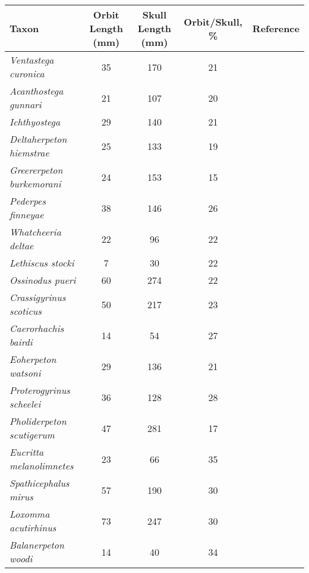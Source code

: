 \begin{tabular}{|l|c|c|c|c|}
\hline
\textbf{Taxon}&\textbf{Orbit Length (mm)}&\textbf{Skull Length (mm)}&\textbf{Orbit/Skull, \%}&\textbf{Reference}\\\hline
\textit{Ventastega curonica}&35&170&21&\citet{Ahlb08a}\\\hline
\textit{Acanthostega gunnari}&21&107&20&\citet{Clac02b,Porr15a}\\\hline
\textit{Ichthyostega}&29&140&21&\citet{Bent90a}\\\hline
\textit{Deltaherpeton hiemstrae}&25&133&19&\citet{Bolt10a}\\\hline
\textit{Greererpeton burkemorani}&24&153&15&\citet{Bent90a}\\\hline
\textit{Pederpes finneyae}&38&146&26&\citet{Clac02a}\\\hline
\textit{Whatcheeria deltae}&22&96&22&\citet{Lomb95a}\\\hline
\textit{Lethiscus stocki}&7&30&22&\citet{Well82a}\\\hline
\textit{Ossinodus pueri}&60&274&22&\citet{Warr04a,Warr07a}\\\hline
\textit{Crassigyrinus scoticus}&50&217&23&\citet{Panc85a}\\\hline
\textit{Caerorhachis bairdi}&14&54&27&\citet{Holm77a}\\\hline
\textit{Eoherpeton watsoni}&29&136&21&\citet{Smit85a}\\\hline
\textit{Proterogyrinus scheelei}&36&128&28&\citet{Holm84a}\\\hline
\textit{Pholiderpeton scutigerum}&47&281&17&\citet{Clac87a}\\\hline
\textit{Eucritta melanolimnetes}&23&66&35&\citet{Clac98a}\\\hline
\textit{Spathicephalus mirus}&57&190&30&\citet{Beau98a}\\\hline
\textit{Loxomma acutirhinus}&73&247&30&\citet{Beau77a}\\\hline
\textit{Balanerpeton woodi}&14&40&34&\citet{Miln94a}\\\hline
\end{tabular}
